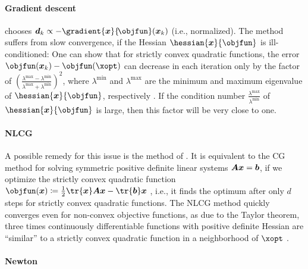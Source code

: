 \paragraph{Gradient descent}

chooses $\*d_k
\propto -\gradient{\*x}{\!\objfun}(\*x_k)$ (i.e., normalized).
The method suffers from slow convergence,
if the Hessian $\hessian{\*x}{\objfun}$ is ill-conditioned:
One can show that for strictly convex quadratic functions,
the error $\objfun(\*x_k) - \objfun(\xopt)$
can decrease in each iteration only by the factor of
$(\tfrac{\lambda^{\max} - \lambda^{\min}}{\lambda^{\max} + \lambda^{\min}})^2$,
where $\lambda^{\min}$ and $\lambda^{\max}$ are the minimum and maximum
eigenvalue of $\hessian{\*x}{\objfun}$, respectively
\cite{Ulbrich12Nichtlineare}.
If the condition number
$\tfrac{\lambda^{\max}}{\lambda^{\min}}$
of $\hessian{\*x}{\objfun}$ is large,
then this factor will be very close to one.

\paragraph{NLCG}

A possible remedy for this issue is the method of
.
It is equivalent to the CG method for
solving symmetric positive definite %
linear systems ${\boldsymbol{A}} {\boldsymbol{x}} = {\boldsymbol{b}}$,
if we optimize the strictly convex quadratic function
$\objfun(\*x) \ceq \frac{1}{2} \tr{\*x} \mat{A} \*x - \tr{\*b} \*x$
, i.e.,
it finds the optimum after only $d$ steps for strictly convex
quadratic functions.
The NLCG method quickly converges even for non-convex objective functions,
as due to the Taylor theorem,
three times continuously differentiable functions
with positive definite Hessian are ``similar'' to a
strictly convex quadratic function in a neighborhood of $\xopt$
\cite{Valentin14Hierarchische}.

\paragraph{Newton}

